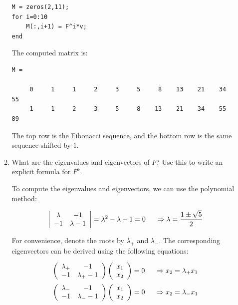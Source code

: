 \documentclass[12pt]{amsart}
\begin{document}
\begin{enumerate}
\begin{enumerate}
\begin{verbatim}
M = zeros(2,11);
for i=0:10
    M(:,i+1) = F^i*v;
end
\end{verbatim}

\vspace{5mm}

The computed matrix is:

\begin{verbatim}
M =

     0     1     1     2     3     5     8    13    21    34    55
     1     1     2     3     5     8    13    21    34    55    89
\end{verbatim}

The top row is the Fibonacci sequence, and the bottom row is the
same sequence shifted by $1$.

\item What are the eigenvalues and eigenvectors of $F$?
Use this to write an explicit formula for $F^k$.

\vspace{5mm}

To compute the eigenvalues and eigenvectors, we can use
the polynomial method:

\[  \left|\begin{array}{cc} \lambda & -1 \\ -1 & \lambda-1
\end{array} \right| = \lambda^2 - \lambda - 1 = 0 \hspace{5mm}
 \Rightarrow \lambda = \frac{1 \pm \sqrt{5}}{2} \]

For convenience, denote the roots by $\lambda_+$ and $\lambda_-$. 
The corresponding eigenvectors can be derived using the following equations:

\[  \left(\begin{array}{cc} \lambda_+  & -1 \\ 
-1 & \lambda_+ - 1 \end{array} \right) 
\left( \begin{array}{c} x_1 \\ x_2 \end{array} \right) = 0    \hspace{5mm}
 \Rightarrow x_2 = \lambda_+ x_1 \]
\[  \left(\begin{array}{cc} \lambda_-  & -1 \\ 
-1 & \lambda_- - 1 \end{array} \right) 
\left( \begin{array}{c} x_1 \\ x_2 \end{array} \right) = 0    \hspace{5mm}
 \Rightarrow x_2 = \lambda_- x_1 \]


\end{enumerate}
\end{enumerate}
\end{document}
